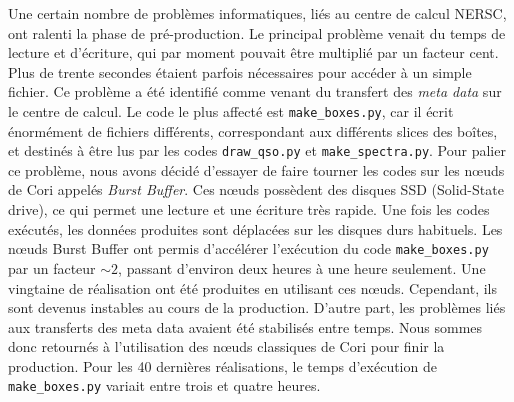 Une certain nombre de problèmes informatiques, liés au centre de calcul NERSC, ont ralenti la phase de pré-production. Le principal problème venait du temps de lecture et d'écriture, qui par moment pouvait être multiplié par un facteur cent. Plus de trente secondes étaient parfois nécessaires pour accéder à un simple fichier. Ce problème a été identifié comme venant du transfert des \emph{meta data} sur le centre de calcul. Le code le plus affecté est \texttt{make\_boxes.py}, car il écrit énormément de fichiers différents, correspondant aux différents slices des boîtes, et destinés à être lus par les codes \texttt{draw\_qso.py} et \texttt{make\_spectra.py}. Pour palier ce problème, nous avons décidé d'essayer de faire tourner les codes sur les nœuds de Cori appelés \emph{Burst Buffer}. Ces nœuds possèdent des disques SSD (Solid-State drive), ce qui permet une lecture et une écriture très rapide. Une fois les codes exécutés, les données produites sont déplacées sur les disques durs habituels. Les nœuds Burst Buffer ont permis d'accélérer l'exécution du code \texttt{make\_boxes.py} par un facteur $\sim \num{2}$, passant d'environ deux heures à une heure seulement. Une vingtaine de réalisation ont été produites en utilisant ces nœuds. Cependant, ils sont devenus instables au cours de la production. D'autre part, les problèmes liés aux transferts des meta data avaient été stabilisés entre temps. Nous sommes donc retournés à l'utilisation des nœuds classiques de Cori pour finir la production. Pour les 40 dernières réalisations, le temps d'exécution de \texttt{make\_boxes.py} variait entre trois et quatre heures.

